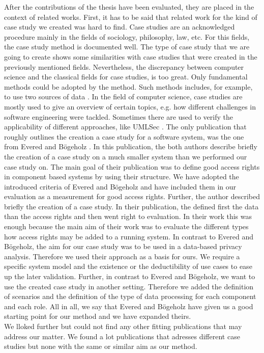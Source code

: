 After the contributions of the thesis have been evaluated, they are placed in the context of related works. First, it has to be said that related work for the kind of case study we created was hard to find. Case studies are an acknowledged procedure mainly in the fields of sociology, philosophy, law, etc. For this fields, the case study method is documented well. The type of case study that we are going to create shows some similarities with case studies that were created in the previously mentioned fields. Nevertheless, the discrepancy between computer science and the classical fields for case studies, is too great. Only fundamental methods could be adopted by the method. Such methods includes, for example, to use two sources of data \cite{cs2sources}. In the field of computer science, case studies are mostly used to give an overview of certain topics, e.g. how different challenges in software engineering were tackled. Sometimes there are used to verify the applicability of different approaches, like UMLSec \cite{UMLSecCS}. The only publication that roughly outlines the creation a case study for a software system, was the one from Evered and Bögeholz \cite{CaseStudyAndAccessrigths}. In this publication, the both authors describe briefly the creation of a case study on a much smaller system than we performed our case study on. The main goal of their publication was to define good access rights in component based systems by using their structure. We have adopted the introduced criteria of Evered and Bögeholz \cite{CaseStudyAndAccessrigths} and have included them in our evaluation as a measurement for good access rights. Further, the author described briefly the creation of a case study. In their publication, the defined first the data than the access rights and then went right to evaluation. In their work this was enough because the main aim of their work was to evaluate the different types how access rights may be added to a running system. In contrast to Evered and Bögeholz, the aim for our case study was to be used in a data-based privacy analysis. Therefore we used their approach as a basis for ours. We require a specific system model and the existence or the deductibility of use cases to ease up the later validation. Further, in contrast to Evered and Bögeholz, we want to use the created case study in another setting. Therefore we added the definition of scenarios and the definition of the type of data processing for each component and each role. All in all, we say that Evered and Bögeholz have given us a good starting point for our method and we have expanded theirs.\\ We lloked further but could not find any other fitting publications that may address our matter. We found a lot publications that adresses different case studies but none with the same or similar aim as our method.
